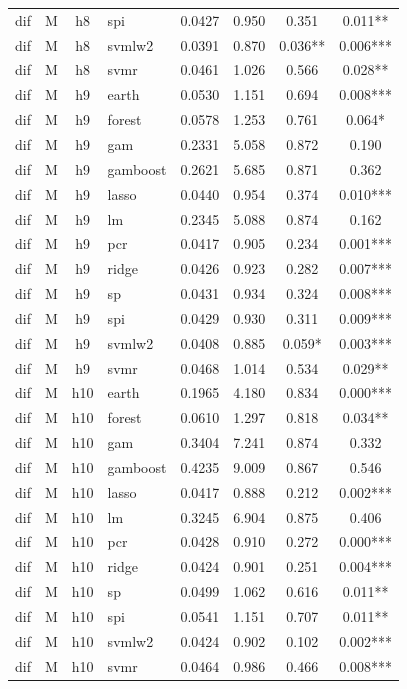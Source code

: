 \begin{ThreePartTable}
\begin{longtable}[t]{llclcccc}
dif & M & h8 & spi & 0.0427 & 0.950 & 0.351 & 0.011**\\
dif & M & h8 & svmlw2 & 0.0391 & 0.870 & 0.036** & 0.006***\\
dif & M & h8 & svmr & 0.0461 & 1.026 & 0.566 & 0.028**\\
\addlinespace
dif & M & h9 & earth & 0.0530 & 1.151 & 0.694 & 0.008***\\
dif & M & h9 & forest & 0.0578 & 1.253 & 0.761 & 0.064*\\
dif & M & h9 & gam & 0.2331 & 5.058 & 0.872 & 0.190\\
dif & M & h9 & gamboost & 0.2621 & 5.685 & 0.871 & 0.362\\
dif & M & h9 & lasso & 0.0440 & 0.954 & 0.374 & 0.010***\\
dif & M & h9 & lm & 0.2345 & 5.088 & 0.874 & 0.162\\
dif & M & h9 & pcr & 0.0417 & 0.905 & 0.234 & 0.001***\\
dif & M & h9 & ridge & 0.0426 & 0.923 & 0.282 & 0.007***\\
dif & M & h9 & sp & 0.0431 & 0.934 & 0.324 & 0.008***\\
dif & M & h9 & spi & 0.0429 & 0.930 & 0.311 & 0.009***\\
dif & M & h9 & svmlw2 & 0.0408 & 0.885 & 0.059* & 0.003***\\
dif & M & h9 & svmr & 0.0468 & 1.014 & 0.534 & 0.029**\\
\addlinespace
dif & M & h10 & earth & 0.1965 & 4.180 & 0.834 & 0.000***\\
dif & M & h10 & forest & 0.0610 & 1.297 & 0.818 & 0.034**\\
dif & M & h10 & gam & 0.3404 & 7.241 & 0.874 & 0.332\\
dif & M & h10 & gamboost & 0.4235 & 9.009 & 0.867 & 0.546\\
dif & M & h10 & lasso & 0.0417 & 0.888 & 0.212 & 0.002***\\
dif & M & h10 & lm & 0.3245 & 6.904 & 0.875 & 0.406\\
dif & M & h10 & pcr & 0.0428 & 0.910 & 0.272 & 0.000***\\
dif & M & h10 & ridge & 0.0424 & 0.901 & 0.251 & 0.004***\\
dif & M & h10 & sp & 0.0499 & 1.062 & 0.616 & 0.011**\\
dif & M & h10 & spi & 0.0541 & 1.151 & 0.707 & 0.011**\\
dif & M & h10 & svmlw2 & 0.0424 & 0.902 & 0.102 & 0.002***\\
dif & M & h10 & svmr & 0.0464 & 0.986 & 0.466 & 0.008***\\

\end{longtable}
\end{ThreePartTable}
